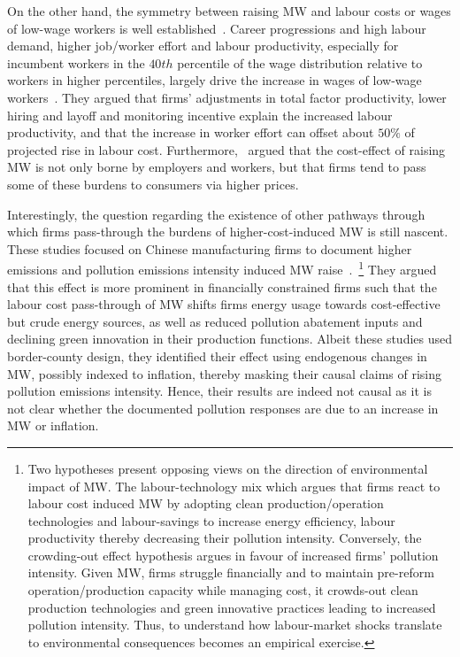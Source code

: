 \documentclass[12pt, english]{article}
\begin{document}
    On the other hand, the symmetry between raising MW and labour costs or wages of low-wage workers is well established~\parencite{medrano2023minimum,clemens2023important}. Career progressions and high labour demand, higher job/worker effort and labour productivity, especially for incumbent workers in the $40th$ percentile of the wage distribution relative to workers in higher percentiles, largely drive the increase in wages of low-wage workers~\parencite{riley2017raising, kim2019minimum, wong2019minimum, baek2021impact, zhao2021effects, seok2022macroeconomic, ku2022does, coviello2022minimum, alexandre2022minimum}. They argued that firms' adjustments in total factor productivity, lower hiring and layoff and monitoring incentive explain the increased labour productivity, and that the increase in worker effort can offset about $50\%$ of projected rise in labour cost. Furthermore,~\cite{harasztosi2019pays} argued that the cost-effect of raising MW is not only borne by employers and workers, but that firms tend to pass some of these burdens to consumers via higher prices.

    Interestingly, the question regarding the existence of other pathways through which firms pass-through the burdens of higher-cost-induced MW is still nascent. These studies focused on Chinese manufacturing firms to document higher emissions and pollution emissions intensity induced MW raise~\parencite{li2023does, zhang2023unintended}.~\footnote{\tiny Two hypotheses present opposing views on the direction of environmental impact of MW. The labour-technology mix which argues that firms react to labour cost induced MW by adopting clean production/operation technologies and labour-savings to increase energy efficiency, labour productivity thereby decreasing their pollution intensity. Conversely, the crowding-out effect hypothesis argues in favour of increased firms' pollution intensity. Given MW, firms struggle financially and to maintain pre-reform operation/production capacity while managing cost, it crowds-out clean production technologies and green innovative practices leading to increased pollution intensity. Thus, to understand how labour-market shocks translate to environmental consequences becomes an empirical exercise.} They argued that this effect is more prominent in financially constrained firms such that the labour cost pass-through of MW shifts firms energy usage towards cost-effective but crude energy sources, as well as reduced pollution abatement inputs and declining green innovation in their production functions. Albeit these studies used border-county design, they identified their effect using endogenous changes in MW, possibly indexed to inflation, thereby masking their causal claims of rising pollution emissions intensity. Hence, their results are indeed not causal as it is not clear whether the documented pollution responses are due to an increase in MW or inflation.
\end{document}
